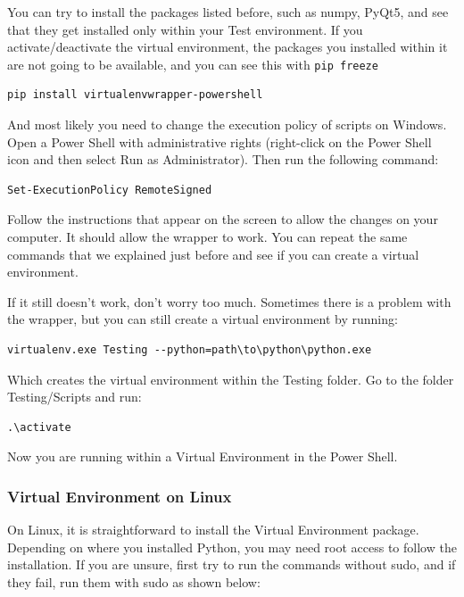 You can try to install the packages listed before, such as numpy, PyQt5,  and see that they get installed only within your Test environment. If you activate/deactivate the virtual environment, the packages you installed within it are not going to be available, and you can see this with \texttt{pip freeze}


\begin{verbatim}
pip install virtualenvwrapper-powershell
\end{verbatim}

And most likely you need to change the execution policy of scripts on Windows. Open a Power Shell with administrative rights (right-click on the Power Shell icon and then select Run as Administrator). Then run the following command:

\begin{verbatim}
Set-ExecutionPolicy RemoteSigned
\end{verbatim}

Follow the instructions that appear on the screen to allow the changes on your computer. It should allow the wrapper to work. You can repeat the same commands that we explained just before and see if you can create a virtual environment.

If it still doesn't work, don't worry too much. Sometimes there is a problem with the wrapper, but you can still create a virtual environment by running:

\begin{verbatim}
virtualenv.exe Testing --python=path\to\python\python.exe
\end{verbatim}

Which creates the virtual environment within the Testing folder. Go to the folder Testing/Scripts and run:
\begin{verbatim}
.\activate
\end{verbatim}

Now you are running within a Virtual Environment in the Power Shell.

\subsubsection{Virtual Environment on Linux}
On Linux, it is straightforward to install the Virtual Environment package. Depending on where you installed Python, you may need root access to follow the installation. If you are unsure, first try to run the commands without sudo, and if they fail, run them with sudo as shown below:


